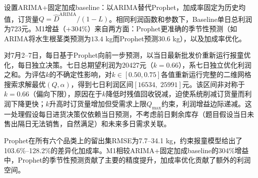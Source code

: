 设置ARIMA+固定加成baseline：以ARIMA替代Prophet\cite{NieYX2024}，加成率固定为历史均值，订货量$Q = \hat{D}^{\text{ARIMA}} / (1-L)$。相同利润函数和参数下，Baseline单日总利润为723元。M1增益（+304\%）来自两方面：Prophet更准确的季节性预测（如ARIMA将水生根茎类预测为$13.4$ kg而Prophet预测$30.6$ kg），以及加成率优化。

对7月2--7日，每日基于Prophet向前一步预测，以当日最新批发价重新运行报童优化，每日独立决策。七日总期望利润为20427元（$k=0.66$），系七日独立优化利润之和。为评估$k$的不确定性影响，对$k\in[0.50,0.75]$各值重新运行完整的二维网格搜索求解最优$(Q,\alpha)$，得到七日利润区间$[16534,\; 25991]$元。该区间非对称于$k=0.66$（偏向下限），原因在于$k$降低时残值回收锐减，迫使系统削减订货量而利润下降更快；$k$升高时订货量增加但受需求上限$Q_{\max}$约束，利润增益边际递减。这一处理假设每日进货决策仅依赖当日预测，不考虑前日剩余库存（题目假设当日未售出隔日无法销售，自然满足）和未来多日需求关联。

Prophet在所有六个品类上的留出集RMSE为7.7--34.1 kg，约束报童模型给出了103.6\%--128.2\%的差异化加成率。M1相较ARIMA+固定加成baseline的304\%增益中，Prophet的季节性预测贡献了主要的精度提升，加成率优化贡献了额外的利润空间。
